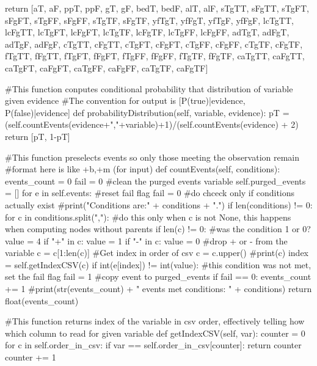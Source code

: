 \documentclass[10pt]{article}
\begin{document}
\begin{spverbatim}
        
        return [aT, aF,  ppT, ppF, gT,  gF, bedT, bedF, alT, alF, sTgTT, sFgTT, sTgFT, sFgFT, sTgFF, sFgFF, sTgTF, sFgTF, yfTgT,  yfFgT, yfTgF, yfFgF, lcTgTT, lcFgTT, lcTgFT, lcFgFT, lcTgTF, lcFgTF, lcTgFF, lcFgFF, adTgT,  adFgT,  adTgF, adFgF, cTgTT, cFgTT, cTgFT, cFgFT, cTgFF, cFgFF, cTgTF, cFgTF, fTgTT, fFgTT, fTgFT, fFgFT, fTgFF, fFgFF, fTgTF, fFgTF, caTgTT, caFgTT, caTgFT, caFgFT, caTgFF, caFgFF, caTgTF, caFgTF]
    
    #This function conputes conditional probability that distribution of variable given evidence
    #The convention for output is [P(true)|evidence, P(false)|evidence]
    def probabilityDistribution(self, variable, evidence):
        pT = (self.countEvents(evidence+","+variable)+1)/(self.countEvents(evidence) + 2)
        return [pT,  1-pT]
        
    #This function preselects events so only those meeting the observation remain
    #format here is like +b,+m (for input)
    def countEvents(self, conditions):
        events_count = 0
        fail = 0
        #clean the purged events variable
        self.purged_events = []
        for e in self.events:
            #reset fail flag
            fail = 0
            #do chceck only if conditions actually exist
            #print("Conditions are:" + conditions + ".")
            if len(conditions) != 0:
                for c in conditions.split(","):
                    #do this only when c is not None, this happens when computing nodes without parents
                    if len(c) != 0:
                        #was the condition 1 or 0?
                        value = 4
                        if "+" in c:
                            value = 1
                        if "-" in c:
                            value = 0
                        #drop + or - from the variable
                        c = c[1:len(c)]
                        #Get index in order of csv
                        c = c.upper()
                        #print(c)
                        index = self.getIndexCSV(c)
                        if int(e[index]) != int(value):
                            #this condition was not met, set the fail flag
                            fail = 1
            #copy event to purged_events
            if fail == 0:
                events_count += 1
        #print(str(events_count) + " events met conditions: " + conditions)
        return float(events_count)
    
    #This function returns index of the variable in csv order, effectively telling how which column to read for given variable
    def getIndexCSV(self, var):
        counter = 0
        for c in self.order_in_csv:
            if var == self.order_in_csv[counter]:
                return counter
            counter += 1



\end{spverbatim}
\end{document}
